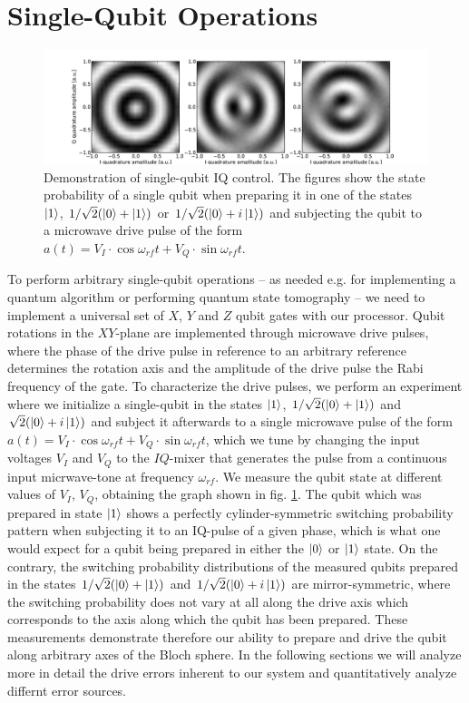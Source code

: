 \section{Single-Qubit Operations}

\begin{figure}[ht!]
	\centering
		\includegraphics[width=1.\textwidth]{"./data/ct5/2010_12_01 - iq tomography/iq_tomographies"}
	\caption[Demonstration of single-qubit IQ control]{Demonstration of single-qubit IQ control. The figures show the state probability of a single qubit when preparing it in one of the states $\left| 1 \right>$, $1/\sqrt{2}(\left| 0 \right>+\left| 1 \right>)$ or $1/\sqrt{2}(\left| 0 \right>+i\left| 1 \right>)$ and subjecting the qubit to a microwave drive pulse of the form $a(t) = V_I\cdot\cos{\omega_{rf}t}+V_Q\cdot\sin{\omega_{rf}t}$.}
	\label{fig:single_qubit_iq_control}
\end{figure}

To perform arbitrary single-qubit operations -- as needed e.g. for implementing a quantum algorithm or performing quantum state tomography -- we need to implement a universal set of $X$, $Y$ and $Z$ qubit gates with our processor. Qubit rotations in the $XY$-plane are implemented through microwave drive pulses, where the phase of the drive pulse in reference to an arbitrary reference determines the rotation axis and the amplitude of the drive pulse the Rabi frequency of the gate. To characterize the drive pulses, we perform an experiment where we initialize a single-qubit in the states $\left| 1 \right>$, $1/\sqrt{2}(\left| 0 \right>+\left| 1 \right>)$ and $\sqrt{2}(\left| 0 \right>+i\left| 1 \right>)$ and subject it afterwards to a single microwave pulse of the form $a(t) = V_I\cdot\cos{\omega_{rf}t}+V_Q\cdot\sin{\omega_{rf}t}$, which we tune by changing the input voltages $V_I$ and $V_Q$ to the $IQ$-mixer that generates the pulse from a continuous input micrwave-tone at frequency $\omega_{rf}$. We measure the qubit state at different values of $V_I$, $V_Q$, obtaining the graph shown in fig. \ref{fig:single_qubit_iq_control}. The qubit which was prepared in state $\left| 1 \right>$ shows a perfectly cylinder-symmetric switching probability pattern when subjecting it to an IQ-pulse of a given phase, which is what one would expect for a qubit being prepared in either the $\left| 0 \right>$ or $\left| 1 \right>$ state. On the contrary, the switching probability distributions of the measured qubits prepared in the states $1/\sqrt{2}(\left| 0 \right>+\left| 1 \right>)$ and $1/\sqrt{2}(\left| 0 \right>+i\left| 1 \right>)$ are mirror-symmetric, where the switching probability does not vary at all along the drive axis which corresponds to the axis along which the qubit has been prepared. These measurements demonstrate therefore our ability to prepare and drive the qubit along arbitrary axes of the Bloch sphere. In the following sections we will analyze more in detail the drive errors inherent to our system and quantitatively analyze differnt error sources. 

